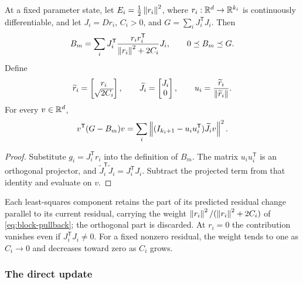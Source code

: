 \begin{proposition}
\label{prop:block-compression}
At a fixed parameter state, let
\(E_i=\tfrac12\left\lVert r_i\right\rVert^2\), where
\(r_i:\mathbb{R}^d\to\mathbb{R}^{k_i}\) is continuously differentiable, and let
\(J_i=Dr_i\), \(C_i>0\), and \(G=\sum_iJ_i^{\mathsf T}J_i\). Then
\begin{equation}
  B_m=\sum_iJ_i^{\mathsf T}
  \frac{r_i r_i^{\mathsf T}}{\left\lVert r_i\right\rVert^2+2C_i}J_i,
  \qquad 0\preceq B_m\preceq G.
  \label{eq:block-pullback}
\end{equation}
Define
\begin{equation}
  \widetilde r_i=\begin{bmatrix}r_i\\\sqrt{2C_i}\end{bmatrix},
  \qquad
  \widetilde J_i=\begin{bmatrix}J_i\\0\end{bmatrix},
  \qquad
  u_i=\frac{\widetilde r_i}{\left\lVert\widetilde r_i\right\rVert}.
  \label{eq:augmented-block-residual}
\end{equation}
For every \(v\in\mathbb{R}^d\),
\begin{equation}
  v^{\mathsf T}(G-B_m)v
  =\sum_i\left\lVert(I_{k_i+1}-u_i u_i^{\mathsf T})\widetilde J_i v\right\rVert^2.
  \label{eq:missed-block-curvature}
\end{equation}
\end{proposition}

\begin{proof}
Substitute \(g_i=J_i^{\mathsf T}r_i\) into the definition of \(B_m\).
The matrix \(u_i u_i^{\mathsf T}\) is an orthogonal projector, and
\(\widetilde J_i^{\mathsf T}\widetilde J_i=J_i^{\mathsf T}J_i\).
Subtract the projected term from that identity and evaluate on \(v\).
\end{proof}

\begin{remark}
\label{rem:retained-curvature}
Each least-squares component retains the part of its predicted residual
change parallel to its current residual, carrying the weight
\(\left\lVert r_i\right\rVert^2/(\left\lVert r_i\right\rVert^2+2C_i)\) of \cref{eq:block-pullback}; the
orthogonal part is discarded. At \(r_i=0\) the contribution vanishes even if
\(J_i^{\mathsf T}J_i\ne0\). For a fixed nonzero residual, the weight tends
to one as \(C_i\to0\) and decreases toward zero as \(C_i\) grows.
\end{remark}

\subsubsection{The direct update}


